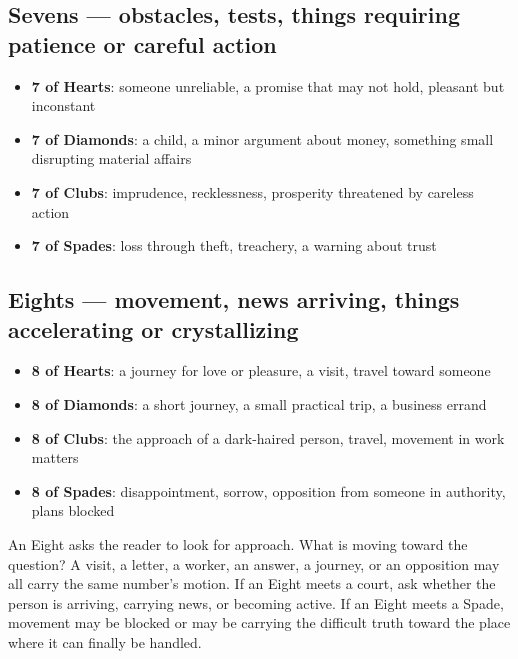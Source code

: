 \subsection{Sevens --- obstacles, tests, things requiring patience or careful action}\label{sevens--obstacles-tests-things-requiring-patience-or-careful-action}

\begin{itemize}
\tightlist
\item
  \textbf{7 of Hearts}: someone unreliable, a promise that may not hold, pleasant but inconstant
\item
  \textbf{7 of Diamonds}: a child, a minor argument about money, something small disrupting material affairs
\item
  \textbf{7 of Clubs}: imprudence, recklessness, prosperity threatened by careless action
\item
  \textbf{7 of Spades}: loss through theft, treachery, a warning about trust
\end{itemize}

\subsection{Eights --- movement, news arriving, things accelerating or crystallizing}\label{eights--movement-news-arriving-things-accelerating-or-crystallizing}

\begin{itemize}
\tightlist
\item
  \textbf{8 of Hearts}: a journey for love or pleasure, a visit, travel toward someone
\item
  \textbf{8 of Diamonds}: a short journey, a small practical trip, a business errand
\item
  \textbf{8 of Clubs}: the approach of a dark-haired person, travel, movement in work matters
\item
  \textbf{8 of Spades}: disappointment, sorrow, opposition from someone in authority, plans blocked
\end{itemize}

An Eight asks the reader to look for approach. What is moving toward the
question? A visit, a letter, a worker, an answer, a journey, or an opposition
may all carry the same number's motion. If an Eight meets a court, ask whether
the person is arriving, carrying news, or becoming active. If an Eight meets a
Spade, movement may be blocked or may be carrying the difficult truth toward
the place where it can finally be handled.

